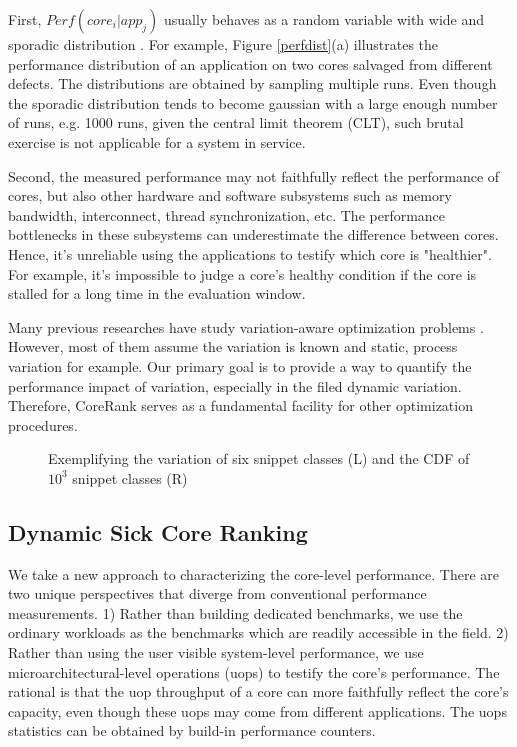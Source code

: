First, $Perf(core_i|app_j)$ usually behaves as a random variable with wide and sporadic distribution \cite{perfcomp}. For example, Figure \ref{perfdist}(a) illustrates the performance distribution of an application on two cores salvaged from different defects. The distributions are obtained by sampling multiple runs. Even though the sporadic distribution tends to become gaussian with a large enough number of runs, e.g. 1000 runs, given the central limit theorem (CLT), such brutal exercise is not applicable for a system in service.

Second, the measured performance may not faithfully reflect the performance of cores, but also other hardware and software subsystems such as memory bandwidth, interconnect, thread synchronization, etc. The performance bottlenecks in these subsystems can underestimate the difference between cores. Hence, it's unreliable using the applications to testify which core is "healthier". For example, it's impossible to judge a core's healthy condition if the core is stalled for a long time in the evaluation window.

Many previous researches have study variation-aware optimization problems \cite{variationdvfs}\cite{dong_prdc09}\cite{Variation_Aware_Application_Scheduling_isca08}\cite{TEATM_isca10}\cite{Revival_08}. However, most of them assume the variation is known and static, process variation for example.   Our primary goal is to provide a way to quantify the performance impact of variation, especially in the filed dynamic variation.  Therefore, CoreRank serves as a fundamental facility for other optimization procedures. 

\begin{figure*}[t]
    \centering
    \caption{Exemplifying the variation of six snippet classes (L) and the CDF of $10^3$ snippet classes (R)}
    \label{sdist}
\end{figure*}

\subsection{Dynamic Sick Core Ranking}
We take a new approach to characterizing the core-level performance. There are two unique perspectives that diverge from conventional performance measurements. 1) Rather than building dedicated benchmarks, we use the ordinary workloads as the benchmarks which are readily accessible in the field. 2) Rather than using the user visible system-level performance, we use microarchitectural-level operations (uops) to testify the core's performance. The rational is that the uop throughput of a core can more faithfully reflect the core's capacity, even though these uops may come from different applications. The uops statistics can be obtained by build-in performance counters.

